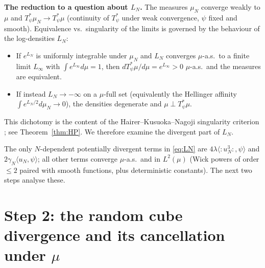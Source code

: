 \noindent\textbf{The reduction to a question about $L_N$.} The measures $\mu_N$
converge weakly to $\mu$ and $T_\psi^*\mu_N\to T_\psi^*\mu$ (continuity of $T_\psi^*$
under weak convergence, $\psi$ fixed and smooth). Equivalence vs.\ singularity of the
limits is governed by the behaviour of the log-densities $L_N$:
\begin{itemize}
\item If $e^{L_N}$ is uniformly integrable under $\mu_N$ and $L_N$ converges
$\mu$-a.s.\ to a finite limit $L_\infty$ with $\int e^{L_\infty}d\mu=1$, then
$dT_\psi^*\mu/d\mu=e^{L_\infty}>0$ $\mu$-a.s.\ and the measures are equivalent.
\item If instead $L_N\to-\infty$ on a $\mu$-full set (equivalently the Hellinger affinity
$\int e^{L_N/2}d\mu_N\to0$), the densities degenerate and $\mu\perp T_\psi^*\mu$.
\end{itemize}
This dichotomy is the content of the Hairer--Kusuoka--Nagoji singularity criterion
\cite{HKN24}; see Theorem~\ref{thm:HP}. We therefore examine the divergent part of
$L_N$.

\medskip
The only $N$-dependent potentially divergent terms in \eqref{eq:LN} are
$4\lambda\langle{:}u_N^3{:},\psi\rangle$ and $2\gamma_N\langle u_N,\psi\rangle$; all
other terms converge $\mu$-a.s.\ and in $L^2(\mu)$ (Wick powers of order $\le2$ paired
with smooth functions, plus deterministic constants). The next two steps analyse these.

\section*{Step 2: the random cube divergence and its cancellation under $\mu$}

